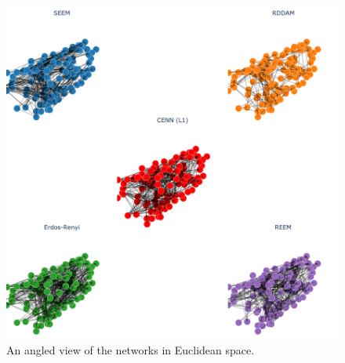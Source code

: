 \begin{figure}[ht]
  \includegraphics[width=\linewidth]{../data/images/3D/all1.png}
  \caption{An angled view of the networks in Euclidean space. }
\end{figure}